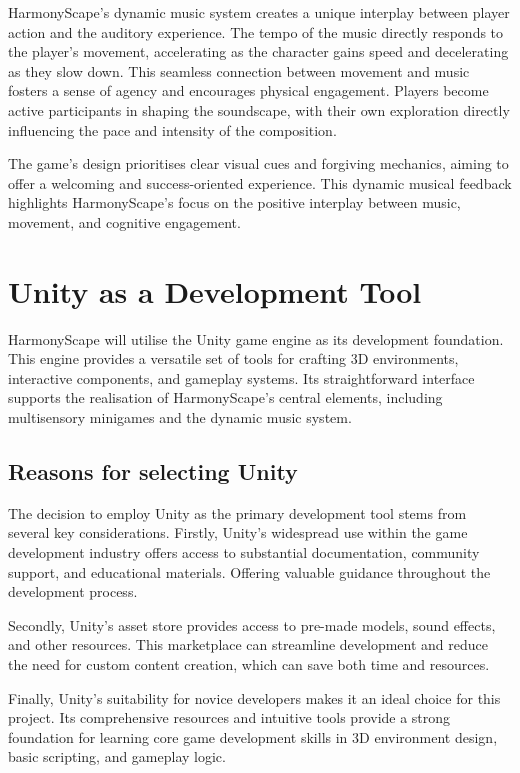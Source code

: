 \documentclass{l4proj}
\begin{document}
HarmonyScape's dynamic music system creates a unique interplay between player action and the auditory experience. The tempo of the music directly responds to the player's movement, accelerating as the character gains speed and decelerating as they slow down. This seamless connection between movement and music fosters a sense of agency and encourages physical engagement. Players become active participants in shaping the soundscape, with their own exploration directly influencing the pace and intensity of the composition.

The game's design prioritises clear visual cues and forgiving mechanics, aiming to offer a welcoming and success-oriented experience. This dynamic musical feedback highlights HarmonyScape's focus on the positive interplay between music, movement, and cognitive engagement.

\section{Unity as a Development Tool}
HarmonyScape will utilise the Unity game engine as its development foundation. This engine provides a versatile set of tools for crafting 3D environments, interactive components, and gameplay systems. Its straightforward interface supports the realisation of HarmonyScape's central elements, including multisensory minigames and the dynamic music system.

\subsection{Reasons for selecting Unity}
The decision to employ Unity as the primary development tool stems from several key considerations. Firstly, Unity's widespread use within the game development industry offers access to substantial documentation, community support, and educational materials. Offering valuable guidance throughout the development process.

Secondly, Unity's asset store provides access to pre-made models, sound effects, and other resources. This marketplace can streamline development and reduce the need for custom content creation, which can save both time and resources.

Finally, Unity's suitability for novice developers makes it an ideal choice for this project. Its comprehensive resources and intuitive tools provide a strong foundation for learning core game development skills in 3D environment design, basic scripting, and gameplay logic.
\end{document}
